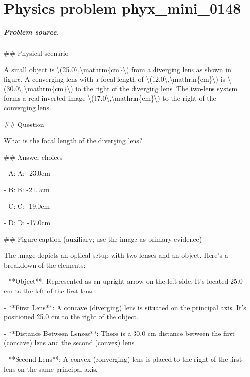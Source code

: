 
\chapter{Physics problem phyx\_mini\_0148}
\label{ch:PhyXMiniProblems_problem_phyx_mini_0148}

\paragraph{Problem source.}
\#\# Physical scenario

A small object is \textbackslash{}(25.0\textbackslash{},\textbackslash{}mathrm\{cm\}\textbackslash{}) from a diverging lens as shown in figure. A converging lens with a focal length of \textbackslash{}(12.0\textbackslash{},\textbackslash{}mathrm\{cm\}\textbackslash{}) is \textbackslash{}(30.0\textbackslash{},\textbackslash{}mathrm\{cm\}\textbackslash{}) to the right of the diverging lens. The two-lens system forms a real inverted image \textbackslash{}(17.0\textbackslash{},\textbackslash{}mathrm\{cm\}\textbackslash{}) to the right of the converging lens.

\#\# Question

What is the focal length of the diverging lens?

\#\# Answer choices

- A: A: -23.0cm

- B: B: -21.0cm

- C: C: -19.0cm

- D: D: -17.0cm

\#\# Figure caption (auxiliary; use the image as primary evidence)

The image depicts an optical setup with two lenses and an object. Here's a breakdown of the elements:

- **Object**: Represented as an upright arrow on the left side. It’s located 25.0 cm to the left of the first lens.

- **First Lens**: A concave (diverging) lens is situated on the principal axis. It's positioned 25.0 cm to the right of the object.

- **Distance Between Lenses**: There is a 30.0 cm distance between the first (concave) lens and the second (convex) lens. 

- **Second Lens**: A convex (converging) lens is placed to the right of the first lens on the same principal axis.

